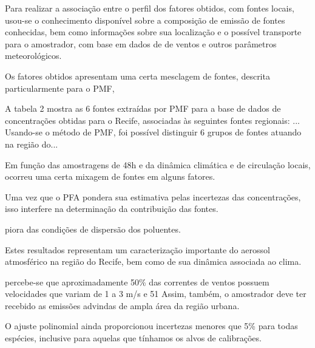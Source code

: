 Para realizar a associação entre o perfil dos fatores obtidos, com fontes locais, usou-se o conhecimento disponível sobre a composição de emissão de fontes conhecidas, bem como  informações sobre sua localização e o possível transporte para o amostrador, com base em dados de de ventos e outros parâmetros meteorológicos.

Os fatores obtidos apresentam uma certa mesclagem de fontes, descrita particularmente para o PMF,

A tabela 2 mostra as 6 fontes extraídas por PMF para a base de dados de concentrações obtidas para o Recife, associadas às seguintes fontes regionais: ...
Usando-se o método de PMF, foi possível distinguir 6 grupos de fontes atuando na região do... 



Em função das amostragens de 48h e da dinâmica climática e de circulação locais, 
ocorreu uma certa mixagem de fontes em alguns fatores. 

Uma vez que o PFA pondera sua estimativa pelas incertezas das concentrações, 
isso interfere na determinação da contribuição das fontes.

piora das condições de dispersão dos poluentes. 

Estes resultados representam um caracterização importante do aerossol atmosférico na região do Recife, bem como de sua dinâmica associada ao clima.

percebe-se que aproximadamente 50\% das correntes de ventos possuem velocidades que variam de 1 a 3 m/s e 51%
Assim, também, o amostrador deve ter recebido as emissões advindas de ampla área da região urbana. 


O ajuste polinomial ainda proporcionou incertezas menores que 5\% para todas espécies, 
inclusive para aquelas que tínhamos os alvos de calibrações.
